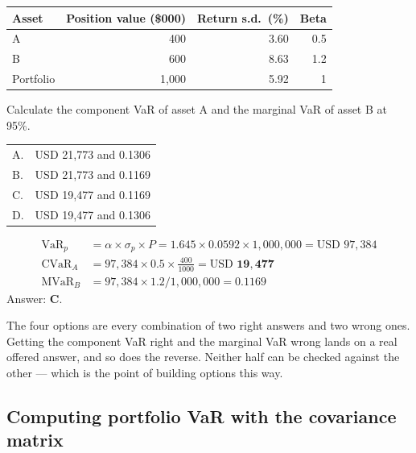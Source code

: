 \begin{imexbox}[title={Component and marginal VaR from a table}]
\begin{center}\small
\begin{tabular}{@{}lrrr@{}}
\toprule
Asset & Position value (\$000) & Return s.d.\ (\%) & Beta \\
\midrule
A & 400 & 3.60 & 0.5 \\
B & 600 & 8.63 & 1.2 \\
Portfolio & 1{,}000 & 5.92 & 1 \\
\bottomrule
\end{tabular}
\end{center}
\medskip
Calculate the component VaR of asset A and the marginal VaR of asset B at 95\%.

\medskip
\begin{tabular}{@{}ll@{}}
A. & USD 21,773 and 0.1306 \\
B. & USD 21,773 and 0.1169 \\
C. & USD 19,477 and 0.1169 \\
D. & USD 19,477 and 0.1306 \\
\end{tabular}

\medskip
\begin{align*}
\text{VaR}_p &= \alpha \times \sigma_p \times P = 1.645 \times 0.0592 \times 1{,}000{,}000 = \text{USD } 97{,}384\\
\text{CVaR}_A &= 97{,}384 \times 0.5 \times \tfrac{400}{1000} = \text{USD } \mathbf{19{,}477}\\
\text{MVaR}_B &= 97{,}384 \times 1.2 / 1{,}000{,}000 = \mathbf{0.1169}
\end{align*}
Answer: \textbf{C}.
\end{imexbox}

\begin{imtrapbox}[breakable=false,title={A two-by-two grid}]
The four options are every combination of two right answers and two wrong ones.
Getting the component VaR right and the marginal VaR wrong lands on a real
offered answer, and so does the reverse. Neither half can be checked against the
other --- which is the point of building options this way.
\end{imtrapbox}

\subsection{Computing portfolio VaR with the covariance matrix}

